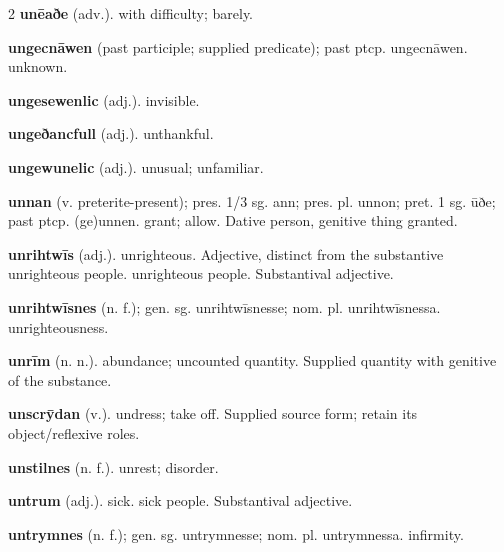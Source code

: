 \begin{multicols*}{2}
\textbf{unēaðe} (adv.). with difficulty; barely.\par
\textbf{ungecnāwen} (past participle; supplied predicate); past ptcp. ungecnāwen. unknown.\par
\textbf{ungesewenlic} (adj.). invisible.\par
\textbf{ungeðancfull} (adj.). unthankful.\par
\textbf{ungewunelic} (adj.). unusual; unfamiliar.\par
\textbf{unnan} (v. preterite-present); pres. 1/3 sg. ann; pres. pl. unnon; pret. 1 sg. ūðe; past ptcp. (ge)unnen. grant; allow. Dative person, genitive thing granted.\par
\textbf{unrihtwīs} (adj.). unrighteous. Adjective, distinct from the substantive unrighteous people. unrighteous people. Substantival adjective.\par
\textbf{unrihtwīsnes} (n. f.); gen. sg. unrihtwīsnesse; nom. pl. unrihtwīsnessa. unrighteousness.\par
\textbf{unrīm} (n. n.). abundance; uncounted quantity. Supplied quantity with genitive of the substance.\par
\textbf{unscrȳdan} (v.). undress; take off. Supplied source form; retain its object/reflexive roles.\par
\textbf{unstilnes} (n. f.). unrest; disorder.\par
\textbf{untrum} (adj.). sick. sick people. Substantival adjective.\par
\textbf{untrymnes} (n. f.); gen. sg. untrymnesse; nom. pl. untrymnessa. infirmity.\par

\end{multicols*}
